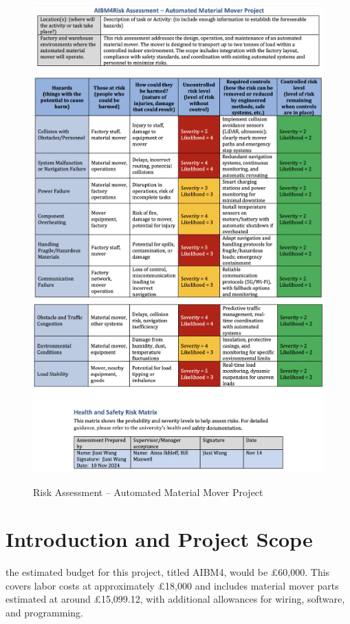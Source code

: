 \documentclass[12pt]{article}
\begin{document}
\begin{figure}[h!]
    \centering
    \includegraphics[width=\textwidth]{Risk_Assessment_Automated_Material_Mover_Project1.png}
     \includegraphics[width=\textwidth]{Risk_Assessment_Automated_Material_Mover_Project2.png}
    \caption{Risk Assessment – Automated Material Mover Project}
    \label{fig:risk_assessment}
\end{figure}

 

 \section{Introduction and Project Scope}
 the estimated budget for this project, titled AIBM4, would be £60,000. This covers labor costs at approximately £18,000 and includes material mover parts estimated at around £15,099.12, with additional allowances for wiring, software, and programming.
\end{document}
